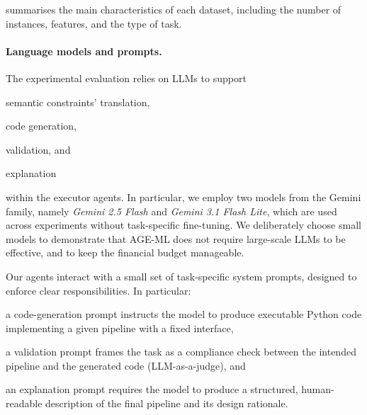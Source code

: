 \documentclass[runningheads]{llncs}
\newenvironment{inlinelist}{\begin{enumerate*}[label=\emph{(\roman*)}]}{\end{enumerate*}}
\newcommand{\ourapproach}[0]{\textsc{AGE-ML}}
\begin{document}
%
%
%
%
 summarises the main characteristics of each dataset, including the number of instances, features, and the type of task.

\paragraph{Language models and prompts.}
%
The experimental evaluation relies on \acp{LLM} to support
\begin{inlinelist}
    \item semantic constraints' translation,
    \item code generation,
    \item validation, and
    \item explanation
\end{inlinelist}
within the executor agents.
%
In particular,
we employ two models from the Gemini family,
namely \textit{Gemini 2.5 Flash} and \textit{Gemini 3.1 Flash Lite},
which are used across experiments without task-specific fine-tuning.
%
We deliberately choose small models to demonstrate that \ourapproach{} does not require large-scale \acp{LLM} to be effective,
and to keep the financial budget manageable.

Our agents interact with a small set of task-specific system prompts,
designed to enforce clear responsibilities.
%
In particular:
\begin{inlinelist}
  \item a code-generation prompt instructs the model to produce executable Python code implementing a given pipeline with a fixed interface,
  \item a validation prompt frames the task as a compliance check between the intended pipeline and the generated code (LLM-as-a-judge), and
  \item an explanation prompt requires the model to produce a structured,
human-readable description of the final pipeline and its design rationale.
\end{inlinelist}
\end{document}

